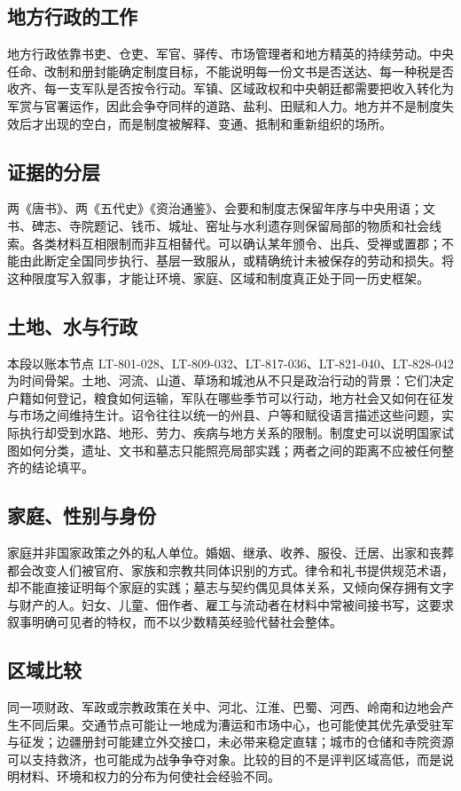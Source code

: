 \subsection{地方行政的工作}
地方行政依靠书吏、仓吏、军官、驿传、市场管理者和地方精英的持续劳动。中央任命、改制和册封能确定制度目标，不能说明每一份文书是否送达、每一种税是否收齐、每一支军队是否按令行动。军镇、区域政权和中央朝廷都需要把收入转化为军赏与官署运作，因此会争夺同样的道路、盐利、田赋和人力。地方并不是制度失效后才出现的空白，而是制度被解释、变通、抵制和重新组织的场所。

\subsection{证据的分层}
两《唐书》、两《五代史》《资治通鉴》、会要和制度志保留年序与中央用语；文书、碑志、寺院题记、钱币、城址、窑址与水利遗存则保留局部的物质和社会线索。各类材料互相限制而非互相替代。可以确认某年颁令、出兵、受禅或置郡；不能由此断定全国同步执行、基层一致服从，或精确统计未被保存的劳动和损失。将这种限度写入叙事，才能让环境、家庭、区域和制度真正处于同一历史框架。
\subsection{土地、水与行政}
本段以账本节点 LT-801-028、LT-809-032、LT-817-036、LT-821-040、LT-828-042 为时间骨架。土地、河流、山道、草场和城池从不只是政治行动的背景：它们决定户籍如何登记，粮食如何运输，军队在哪些季节可以行动，地方社会又如何在征发与市场之间维持生计。诏令往往以统一的州县、户等和赋役语言描述这些问题，实际执行却受到水路、地形、劳力、疾病与地方关系的限制。制度史可以说明国家试图如何分类，遗址、文书和墓志只能照亮局部实践；两者之间的距离不应被任何整齐的结论填平。

\subsection{家庭、性别与身份}
家庭并非国家政策之外的私人单位。婚姻、继承、收养、服役、迁居、出家和丧葬都会改变人们被官府、家族和宗教共同体识别的方式。律令和礼书提供规范术语，却不能直接证明每个家庭的实践；墓志与契约偶见具体关系，又倾向保存拥有文字与财产的人。妇女、儿童、佃作者、雇工与流动者在材料中常被间接书写，这要求叙事明确可见者的特权，而不以少数精英经验代替社会整体。

\subsection{区域比较}
同一项财政、军政或宗教政策在关中、河北、江淮、巴蜀、河西、岭南和边地会产生不同后果。交通节点可能让一地成为漕运和市场中心，也可能使其优先承受驻军与征发；边疆册封可能建立外交接口，未必带来稳定直辖；城市的仓储和寺院资源可以支持救济，也可能成为战争争夺对象。比较的目的不是评判区域高低，而是说明材料、环境和权力的分布为何使社会经验不同。


